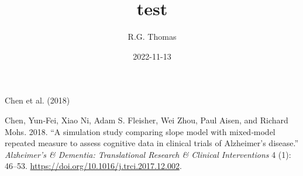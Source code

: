 \documentclass[
  11pt,
]{article}
\title{test}
\author{R.G. Thomas}
\date{2022-11-13}
\newlength{\cslhangindent}
\newlength{\cslentryspacingunit} %
\newenvironment{CSLReferences}[2] %
 {%
  \setlength{\parindent}{0pt}
  \ifodd #1
  \let\oldpar\par
  \def\par{\hangindent=\cslhangindent\oldpar}
  \fi
  \setlength{\parskip}{#2\cslentryspacingunit}
 }%
 {}
\begin{document}
\maketitle

{
\setcounter{tocdepth}{2}
\tableofcontents
}
\thispagestyle{fancy}

Chen et al. (2018)

\hypertarget{refs}{}
\begin{CSLReferences}{1}{0}
\leavevmode{}%
Chen, Yun‐Fei, Xiao Ni, Adam S. Fleisher, Wei Zhou, Paul Aisen, and
Richard Mohs. 2018. {``{A simulation study comparing slope model with
mixed‐model repeated measure to assess cognitive data in clinical trials
of Alzheimer's disease}.''} \emph{Alzheimer's \& Dementia: Translational
Research \& Clinical Interventions} 4 (1): 46--53.
\url{https://doi.org/10.1016/j.trci.2017.12.002}.

\end{CSLReferences}
\end{document}

